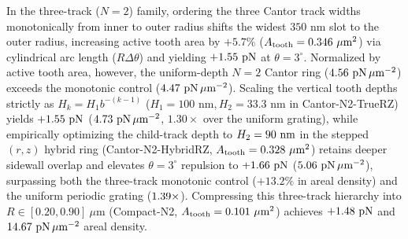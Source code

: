 \documentclass[pdflatex,sn-nature]{sn-jnl}
\DeclareRobustCommand{\roundtwo}[1]{\fpeval{round(#1,2)}}
\DeclareRobustCommand{\roundthree}[1]{\fpeval{round(#1,3)}}
\begin{document}
In the three-track ($N=2$) family, ordering the three Cantor track widths monotonically from inner to outer radius shifts the widest $350\text{ nm}$ slot to the outer radius, increasing active tooth area by $+5.7\%$ ($A_{\rm tooth} = \roundthree{\FractalCtrlSizematchedMonotonicActiveToothAreaUmtwo}\ \mu\text{m}^2$) via cylindrical arc length ($R\Delta\theta$) and yielding $+\roundtwo{\CtrlSizematchedMonotonicBemThetathreeFZPn}\text{ pN}$ at $\theta=3^\circ$. Normalized by active tooth area, however, the uniform-depth $N=2$ Cantor ring ($\roundtwo{\NatureCantorNtwoFlatzFRepPnPerToothAreaUmtwo}\text{ pN}\,\mu\text{m}^{-2}$) exceeds the monotonic control ($\roundtwo{\NatureCtrlSizematchedMonotonicFRepPnPerToothAreaUmtwo}\text{ pN}\,\mu\text{m}^{-2}$). Scaling the vertical tooth depths strictly as $H_k = H_1 b^{-(k-1)}$ ($H_1 = 100\text{ nm}, H_2 = 33.3\text{ nm}$ in Cantor-N2-TrueRZ) yields $+\roundtwo{\CantorNtwoTruerzBemThetathreeFZPn}\text{ pN}$ ($\roundtwo{\NatureCantorNtwoTruerzFRepPnPerToothAreaUmtwo}\text{ pN}\,\mu\text{m}^{-2}$, $1.30\times$ over the uniform grating), while empirically optimizing the child-track depth to $H_2 = 90{}\text{ nm}$ in the stepped $(r,z)$ hybrid ring (Cantor-N2-HybridRZ, $A_{\rm tooth} = \roundthree{\FractalCantorRzScalematchedActiveToothAreaUmtwo}\ \mu\text{m}^2$) retains deeper sidewall overlap and elevates $\theta=3^\circ$ repulsion to $+\roundtwo{\CantorNtwoHybridrzBemStdFZPn}\text{ pN}$ ($\roundtwo{\NatureCantorNtwoHybridrzFRepPnPerToothAreaUmtwo}\text{ pN}\,\mu\text{m}^{-2}$), surpassing both the three-track monotonic control ($+13.2\%$ in areal density) and the uniform periodic grating ($1.39{}\times$). Compressing this three-track hierarchy into $R \in [0.20, 0.90]\ \mu\text{m}$ (Compact-N2, $A_{\rm tooth} = \roundthree{\RotCeightCompactNtwoStandardThetaZerofoureightpzeroPolarOverlapUmtwo}\ \mu\text{m}^2$) achieves $+\roundtwo{\NatureRotCeightCompactNtwoFRepPn}\text{ pN}$ and $\roundtwo{\NatureRotCeightCompactNtwoFRepPnPerToothAreaUmtwo}\text{ pN}\,\mu\text{m}^{-2}$ areal density.
\end{document}

